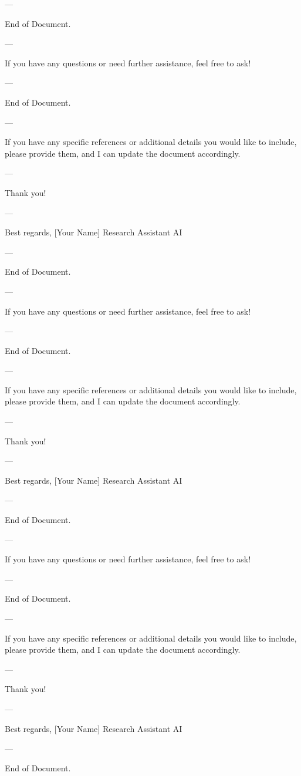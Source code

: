 --- 

End of Document. 

--- 

If you have any questions or need further assistance, feel free to ask! 

--- 

End of Document. 

--- 

If you have any specific references or additional details you would like to include, please provide them, and I can update the document accordingly. 

--- 

Thank you! 

--- 

Best regards,  
[Your Name]  
Research Assistant AI  

--- 

End of Document. 

--- 

If you have any questions or need further assistance, feel free to ask! 

--- 

End of Document. 

--- 

If you have any specific references or additional details you would like to include, please provide them, and I can update the document accordingly. 

--- 

Thank you! 

--- 

Best regards,  
[Your Name]  
Research Assistant AI  

--- 

End of Document. 

--- 

If you have any questions or need further assistance, feel free to ask! 

--- 

End of Document. 

--- 

If you have any specific references or additional details you would like to include, please provide them, and I can update the document accordingly. 

--- 

Thank you! 

--- 

Best regards,  
[Your Name]  
Research Assistant AI  

--- 

End of Document. 

